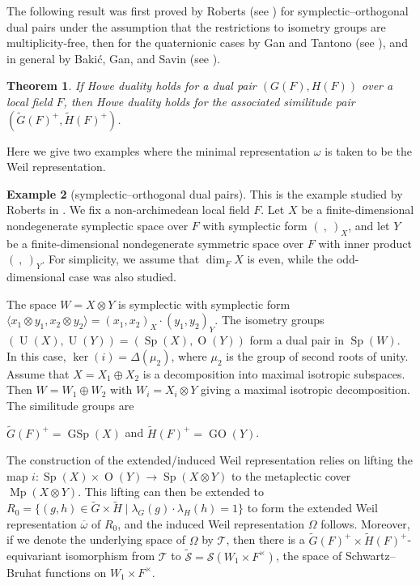\documentclass[11pt]{article}
\theoremstyle{plain}
\newtheorem{theorem}{Theorem}[section]
\theoremstyle{remark}
\theoremstyle{definition}
\newtheorem{example}[theorem]{Example}
\DeclareMathOperator{\U}{U}
\DeclareMathOperator{\Ot}{O}
\DeclareMathOperator{\GO}{GO}
\DeclareMathOperator{\GSp}{GSp}
\DeclareMathOperator{\Mp}{Mp}
\DeclareMathOperator{\Sp}{Sp}
\begin{document}
The following result was first proved by Roberts (see \cite[Theorem~4.4]{RobertBrooks1996}) for symplectic--orthogonal dual pairs under the assumption that the restrictions to isometry groups are multiplicity-free, then for the quaternionic cases by Gan and Tantono (see \cite[Proposition~3.3(iv)]{GanTan2014}), and in general by Baki\'{c}, Gan, and Savin (see \cite[Proposition~5.1]{BGS2024}).

\begin{theorem}\label{tsimHowe}
If Howe duality holds for a dual pair $(G(F),H(F))$ over a local field $F$, then Howe duality holds for the associated similitude pair $(\widetilde{G}(F)^+,\widetilde{H}(F)^+)$.
\end{theorem}

Here we give two examples where the minimal representation $\omega$ is taken to be the Weil representation.

\begin{example}[symplectic--orthogonal dual pairs]
This is the example studied by Roberts in \cite{RobertBrooks1996}.
We fix a non-archimedean local field $F$.
Let $X$ be a finite-dimensional nondegenerate symplectic space over $F$ with symplectic form $(~,~)_X$, and let $Y$ be a finite-dimensional nondegenerate symmetric space over $F$ with inner product $(~,~)_Y$.
For simplicity, we assume that $\dim_{F}X$ is even, while the odd-dimensional case was also studied.

The space $W=X\otimes Y$ is symplectic with symplectic form
$\langle x_1\otimes y_1,x_2\otimes y_2\rangle=(x_1,x_2)_X\cdot (y_1,y_2)_Y$.
The isometry groups $(\U(X),\U(Y))=(\Sp(X),\Ot(Y))$ form a dual pair in $\Sp(W)$.
In this case, $\ker(i)=\Delta(\mu_2)$, where $\mu_2$ is the group of second roots of unity.
Assume that $X=X_1\oplus X_2$ is a decomposition into maximal isotropic subspaces.
Then $W=W_1\oplus W_2$ with $W_i=X_i\otimes Y$ giving a maximal isotropic decomposition.
The similitude groups are
\begin{center}
    $\widetilde{G}(F)^{+}=\GSp(X)$ and $\widetilde{H}(F)^{+}=\GO(Y)$.
\end{center}

The construction of the extended/induced Weil representation relies on lifting the map
$i\colon \Sp(X)\times\Ot(Y)\to\Sp(X\otimes Y)$ to the metaplectic cover $\Mp(X\otimes Y)$.
This lifting can then be extended to
$R_0=\{(g,h)\in \widetilde{G}\times \widetilde{H}\mid\lambda_{G}(g)\cdot \lambda_{H}(h)=1\}$
to form the extended Weil representation $\overline{\omega}$ of $R_0$, and the induced Weil representation $\Omega$ follows.
Moreover, if we denote the underlying space of $\Omega$ by $\mathcal{T}$, then there is a $\widetilde{G}(F)^{+}\times\widetilde{H}(F)^{+}$-equivariant isomorphism from $\mathcal{T}$ to
$\tilde{\mathcal{S}}=\mathcal{S}(W_1\times F^{\times})$, the space of Schwartz--Bruhat functions on $W_1\times F^{\times}$.
\end{example}
\end{document}
